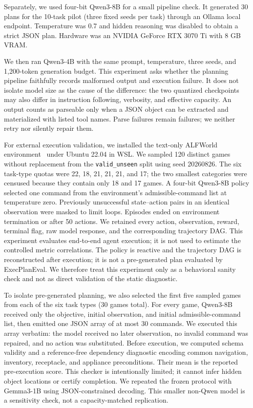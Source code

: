 \documentclass[10pt]{article}
\begin{document}
Separately, we used four-bit Qwen3-8B for a small pipeline check. It generated 30
plans for the 10-task pilot (three fixed seeds per task) through an Ollama local
endpoint. Temperature was 0.7 and hidden reasoning was disabled to obtain a
strict JSON plan. Hardware was an NVIDIA GeForce RTX 3070 Ti with 8 GB VRAM.

We then ran Qwen3-4B with the same prompt, temperature, three seeds, and
1,200-token generation budget. This experiment asks whether the planning
pipeline faithfully records malformed output and execution failure. It does
not isolate model size as the cause of the difference: the two quantized
checkpoints may also differ in instruction following, verbosity, and effective
capacity. An output counts as parseable only when a JSON object can be
extracted and materialized with listed tool names. Parse failures remain
failures; we neither retry nor silently repair them.

For external execution validation, we installed the text-only ALFWorld
environment~\cite{shridhar2021alfworld} under Ubuntu 22.04 in WSL. We sampled
120 distinct games without replacement from the \texttt{valid\_unseen} split
using seed 20260826. The six task-type quotas were 22, 18, 21, 21, 21, and 17;
the two smallest categories were censused because they contain only 18 and 17
games. A four-bit Qwen3-8B policy selected one command from the environment's
admissible-command list at temperature zero. Previously unsuccessful
state--action pairs in an identical observation were masked to limit loops.
Episodes ended on environment termination or after 50 actions. We retained
every action, observation, reward, terminal flag, raw model response, and the
corresponding trajectory DAG. This experiment evaluates end-to-end agent
execution; it is not used to estimate the controlled metric correlations.
The policy is reactive and the trajectory DAG is reconstructed after execution;
it is not a pre-generated plan evaluated by ExecPlanEval. We therefore treat
this experiment only as a behavioral sanity check and not as direct validation
of the static diagnostic.

To isolate pre-generated planning, we also selected the first five sampled
games from each of the six task types (30 games total). For every game,
Qwen3-8B received only the objective, initial observation, and initial
admissible-command list, then emitted one JSON array of at most 30 commands.
We executed this array verbatim: the model received no later observation, no
invalid command was repaired, and no action was substituted. Before execution,
we computed schema validity and a reference-free dependency diagnostic encoding
common navigation, inventory, receptacle, and appliance preconditions. Their
mean is the reported pre-execution score. This checker is intentionally limited;
it cannot infer hidden object locations or certify completion.
We repeated the frozen protocol with Gemma3-1B using JSON-constrained decoding.
This smaller non-Qwen model is a sensitivity check, not a capacity-matched
replication.
\end{document}
